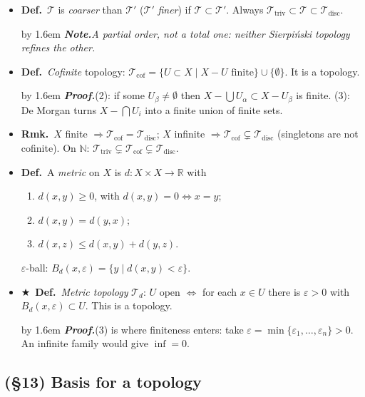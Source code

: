 \documentclass[12pt,a4paper]{article}
\newcommand{\Dfn}{\textbf{Def.}~}
\newcommand{\Rmk}{\textbf{Rmk.}~}
\newcommand{\Key}{$\bigstar$~}                  %
\newcommand{\Pf}[1]{%
  \par\addvspace{7pt}\nopagebreak
  \begingroup
    \advance\leftskip by 1.6em
    \parindent=0pt \small\color{prf}%
    \textbf{\textit{Proof.}}\enspace #1\par
  \endgroup
  \addvspace{9pt}}
\newcommand{\Cue}[1]{%
  \par\addvspace{7pt}\nopagebreak
  \begingroup
    \advance\leftskip by 1.6em
    \parindent=0pt \small\color{cue}%
    \textbf{\textit{Note.}}\enspace \textit{#1}\par
  \endgroup
  \addvspace{9pt}}
\newenvironment{BL}%
  {\begin{itemize}[leftmargin=1.4em,labelsep=0.55em,itemsep=11pt,topsep=11pt,parsep=0pt]}%
  {\end{itemize}}
\newenvironment{NL}%
  {\begin{enumerate}[label=(\arabic*),leftmargin=2em,labelsep=0.45em,itemsep=6pt,topsep=7pt,parsep=0pt]}%
  {\end{enumerate}}
\newcommand{\RR}{\mathbb{R}}
\newcommand{\NN}{\mathbb{N}}
\newcommand{\cT}{\mathcal{T}}
\renewcommand{\iff}{\Leftrightarrow}
\newcommand{\imp}{\Rightarrow}
\newcommand{\Tdisc}{\cT_{\mathrm{disc}}}
\newcommand{\Ttriv}{\cT_{\mathrm{triv}}}
\newcommand{\Tcof}{\cT_{\mathrm{cof}}}
\begin{document}
\begin{BL}
      $\{\{a\},\{c\},\{a,b\},\{a,c\}\}$ (misses $\emptyset,X$);
      $\{\emptyset,\{a\},\{b\},X\}$ (no union);
      $\{\emptyset,\{a,b\},\{a,c\},X\}$ (no intersection).
\item \Dfn $\cT$ is \emph{coarser} than $\cT'$ ($\cT'$ \emph{finer}) if $\cT\subset\cT'$.
      Always $\Ttriv\subset\cT\subset\Tdisc$.
\Cue{A partial order, not a total one: neither Sierpi\'nski topology refines the other.}
\item \Dfn \emph{Cofinite} topology: $\Tcof=\{U\subset X\mid X-U\text{ finite}\}\cup\{\emptyset\}$.
      It is a topology.
\Pf{(2): if some $U_\beta\neq\emptyset$ then $X-\bigcup U_\alpha\subset X-U_\beta$ is finite.
(3): De Morgan turns $X-\bigcap U_i$ into a finite union of finite sets.}
\item \Rmk $X$ finite $\imp\Tcof=\Tdisc$;\; $X$ infinite $\imp\Tcof\subsetneq\Tdisc$
      (singletons are not cofinite).
      On $\NN$: $\Ttriv\subsetneq\Tcof\subsetneq\Tdisc$.
\item \Dfn A \emph{metric} on $X$ is $d\colon X\times X\to\RR$ with
  \begin{NL}
  \item $d(x,y)\ge0$, with $d(x,y)=0\iff x=y$;
  \item $d(x,y)=d(y,x)$;
  \item $d(x,z)\le d(x,y)+d(y,z)$.
  \end{NL}
  $\varepsilon$-ball: $B_d(x,\varepsilon)=\{y\mid d(x,y)<\varepsilon\}$.
\item \Key\Dfn \emph{Metric topology} $\cT_d$:
      $U$ open $\iff$ for each $x\in U$ there is $\varepsilon>0$ with $B_d(x,\varepsilon)\subset U$.
      This is a topology.
\Pf{(3) is where finiteness enters: take $\varepsilon=\min\{\varepsilon_1,\dots,\varepsilon_n\}>0$.
An infinite family would give $\inf=0$.}
\end{BL}

\subsection{(\S13) Basis for a topology}
\end{document}
